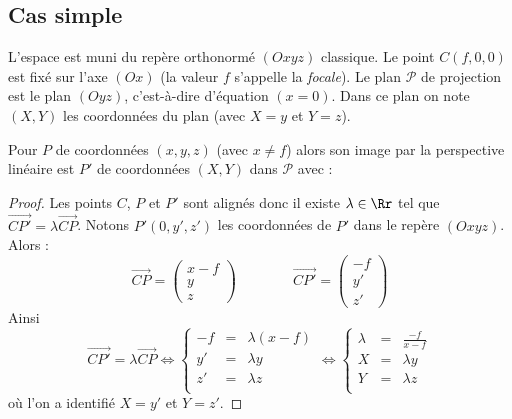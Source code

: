 \documentclass[11pt,class=report,crop=false]{standalone}
\begin{document}
\subsection{Cas simple}

L'espace est muni du repère orthonormé $(Oxyz)$ classique.
Le point $C(f,0,0)$ est fixé sur l'axe $(Ox)$ (la valeur $f$ s'appelle la \emph{focale}).
Le plan $\mathcal{P}$ de projection est le plan $(Oyz)$, c'est-à-dire d'équation $(x=0)$. Dans ce plan on note $(X,Y)$ les coordonnées du plan (avec $X=y$ et $Y=z$).



\begin{proposition}
Pour $P$ de coordonnées $(x,y,z)$ (avec $x \neq f$) alors son image par la perspective linéaire est $P'$ de coordonnées $(X,Y)$ dans $\mathcal{P}$ avec :
\end{proposition}


\begin{proof}
Les points $C$, $P$ et $P'$ sont alignés donc il existe $\lambda \in \Rr$ tel que $\overrightarrow{CP'} = \lambda \overrightarrow{CP}$.
Notons $P'(0,y',z')$ les coordonnées de $P'$ dans le repère $(Oxyz)$. Alors :
$$
\overrightarrow{CP} = \begin{pmatrix}x-f\\y\\z\end{pmatrix}
\qquad\qquad
\overrightarrow{CP'} = \begin{pmatrix}-f\\y'\\z'\end{pmatrix}$$
Ainsi
$$\overrightarrow{CP'} = \lambda \overrightarrow{CP}
\iff
\left\{\begin{array}{rcl}
-f &=& \lambda (x-f) \\
y'  &=& \lambda y \\
z' &=& \lambda z \\
\end{array}\right.
\iff
\left\{\begin{array}{rcl}
\lambda &=&  \frac{-f}{x-f} \\
X &=& \lambda y \\
Y &=& \lambda z \\
\end{array}\right.$$
où l'on a identifié $X=y'$ et $Y=z'$.
\end{proof}
\end{document}
